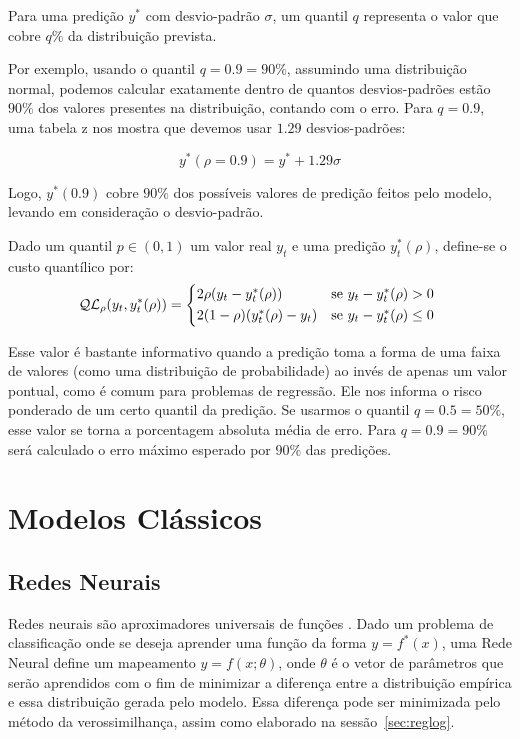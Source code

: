 Para uma predição $y^*$ com desvio-padrão $\sigma$, um quantil $q$ representa o
valor que cobre $q\%$ da distribuição prevista.

Por exemplo, usando o quantil $q=0.9=90\%$, assumindo uma distribuição normal,
podemos calcular exatamente dentro de quantos desvios-padrões estão $90\%$ dos valores
presentes na distribuição, contando com o erro. Para $q=0.9$, uma tabela z nos mostra que devemos
usar $1.29$ desvios-padrões:

\[
  y^*(\rho = 0.9) = y^* + 1.29\sigma
\]

Logo, $y^*(0.9)$ cobre $90\%$ dos possíveis valores de predição feitos pelo
modelo, levando em consideração o desvio-padrão.

Dado um quantil $p \in (0,1)$ um valor real $y_{t}$ e uma predição
$y^{*}_{t}(\rho)$, define-se o custo quantílico por: \\

\begin{equation}
  \mathcal{QL}_{\rho}(y_{t},y^{*}_{t}(\rho)) =
\begin{cases*}
  2 \rho(y_{t} - y^{*}_{t}(\rho)) & se $ y_{t} - y^{*}_{t}(\rho) > 0$ \\
  2 (1 - \rho)(y^{*}_{t}(\rho) - y_{t}) & se $y_{t} - y^{*}_{t}(\rho) \leq 0$
\end{cases*}
\end{equation}


Esse valor é bastante informativo quando a predição toma a forma de uma faixa de
valores (como uma distribuição de probabilidade) ao invés de apenas um valor
pontual, como é comum para problemas de regressão. Ele nos informa o risco
ponderado de um certo quantil da predição. Se usarmos o quantil $q=0.5=50\%$,
esse valor se torna a porcentagem absoluta média de erro. Para $q=0.9=90\%$ será
calculado o erro máximo esperado por $90\%$ das predições. 



\section{Modelos Clássicos} 


\subsection{Redes Neurais}

\label{sec:nn}
Redes neurais são aproximadores universais de funções \citep{nnuni}. Dado um problema
de classificação onde se deseja aprender uma função da forma $y = f^*(x)$, uma
Rede Neural define um mapeamento $y = f(x ; \theta)$, onde $\theta$ é o vetor de
parâmetros que serão aprendidos com o fim de minimizar a diferença entre a
distribuição empírica e essa distribuição gerada pelo modelo. Essa diferença pode
ser minimizada pelo método da verossimilhança, assim como elaborado na sessão~\ref{sec:reglog}.\\

